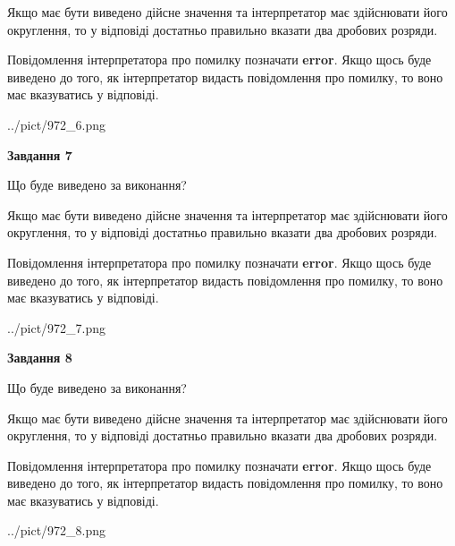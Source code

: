 \documentclass[12pt, ukrainian]{article}
\begin{document}
{\begin {Large}
Якщо має бути виведено дійсне значення та інтерпретатор має здійснювати його округлення, 
то у відповіді достатньо правильно вказати два дробових розряди.

Повідомлення інтерпретатора про помилку позначати \textbf{error}.
Якщо щось буде виведено до того, як інтерпретатор видасть повідомлення про помилку, 
то воно має вказуватись у відповіді. \par

\begin{center}
	{../pict/972_6.png}
\end{center}
\newpage

{\begin {center}\textbf{Завдання 7}\end {center}}\par
Що буде виведено за виконання? \par

Якщо має бути виведено дійсне значення та інтерпретатор має здійснювати його округлення, 
то у відповіді достатньо правильно вказати два дробових розряди.

Повідомлення інтерпретатора про помилку позначати \textbf{error}.
Якщо щось буде виведено до того, як інтерпретатор видасть повідомлення про помилку, 
то воно має вказуватись у відповіді. \par

\begin{center}
	{../pict/972_7.png}
\end{center}
\newpage

{\begin {center}\textbf{Завдання 8}\end {center}}\par
Що буде виведено за виконання? \par

Якщо має бути виведено дійсне значення та інтерпретатор має здійснювати його округлення, 
то у відповіді достатньо правильно вказати два дробових розряди.

Повідомлення інтерпретатора про помилку позначати \textbf{error}.
Якщо щось буде виведено до того, як інтерпретатор видасть повідомлення про помилку, 
то воно має вказуватись у відповіді. \par

\begin{center}
	{../pict/972_8.png}
\end{center}
\newpage


\end{Large}}
\end{document}
